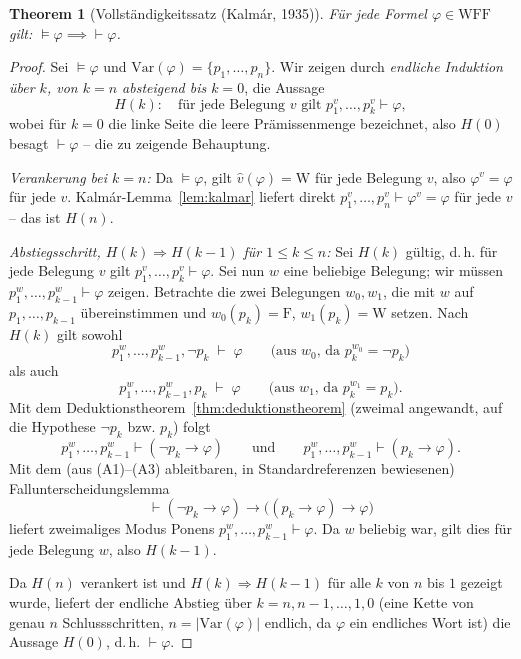\documentclass[12pt, a4paper]{article}
\newtheorem{theorem}{Theorem}[section]
\theoremstyle{definition}
\theoremstyle{remark}
\newcommand{\W}{\mathrm{W}}
\newcommand{\F}{\mathrm{F}}
\newcommand{\WFF}{\mathrm{WFF}}
\newcommand{\Var}{\mathrm{Var}}
\begin{document}
\begin{theorem}[Vollständigkeitssatz (Kalmár, 1935)]
\label{thm:vollstaendigkeit}
Für jede Formel $\varphi \in \WFF$ gilt: $\models \varphi \implies \vdash \varphi$.
\end{theorem}
\begin{proof}
Sei $\models\varphi$ und $\Var(\varphi) = \{p_1,\dots,p_n\}$. Wir zeigen durch \emph{endliche Induktion über $k$, von $k=n$ absteigend bis $k=0$}, die Aussage
\[
  H(k): \quad \text{für jede Belegung } v \text{ gilt } p_1^v,\dots,p_k^v \vdash \varphi,
\]
wobei für $k=0$ die linke Seite die leere Prämissenmenge bezeichnet, also $H(0)$ besagt $\vdash\varphi$ -- die zu zeigende Behauptung.

\emph{Verankerung bei $k=n$:} Da $\models\varphi$, gilt $\hat v(\varphi)=\W$ für jede Belegung $v$, also $\varphi^v = \varphi$ für jede $v$. Kalmár-Lemma~\ref{lem:kalmar} liefert direkt $p_1^v,\dots,p_n^v \vdash \varphi^v = \varphi$ für jede $v$ -- das ist $H(n)$.

\emph{Abstiegsschritt, $H(k) \Rightarrow H(k-1)$ für $1\le k\le n$:} Sei $H(k)$ gültig, d.\,h. für jede Belegung $v$ gilt $p_1^v,\dots,p_k^v \vdash \varphi$. Sei nun $w$ eine beliebige Belegung; wir müssen $p_1^w,\dots,p_{k-1}^w \vdash \varphi$ zeigen. Betrachte die zwei Belegungen $w_0,w_1$, die mit $w$ auf $p_1,\dots,p_{k-1}$ übereinstimmen und $w_0(p_k)=\F$, $w_1(p_k)=\W$ setzen. Nach $H(k)$ gilt sowohl
\[
  p_1^w,\dots,p_{k-1}^w, \neg p_k \;\vdash\; \varphi \qquad\text{(aus $w_0$, da $p_k^{w_0}=\neg p_k$)}
\]
als auch
\[
  p_1^w,\dots,p_{k-1}^w, p_k \;\vdash\; \varphi \qquad\text{(aus $w_1$, da $p_k^{w_1}=p_k$).}
\]
Mit dem Deduktionstheorem~\ref{thm:deduktionstheorem} (zweimal angewandt, auf die Hypothese $\neg p_k$ bzw. $p_k$) folgt
\[
  p_1^w,\dots,p_{k-1}^w \vdash (\neg p_k \to \varphi) \qquad\text{und}\qquad p_1^w,\dots,p_{k-1}^w \vdash (p_k \to \varphi).
\]
Mit dem (aus (A1)--(A3) ableitbaren, in Standardreferenzen bewiesenen) Fallunterscheidungslemma
\[
  \vdash (\neg p_k \to \varphi) \to \big((p_k\to\varphi)\to\varphi\big)
\]
liefert zweimaliges Modus Ponens $p_1^w,\dots,p_{k-1}^w \vdash \varphi$. Da $w$ beliebig war, gilt dies für jede Belegung $w$, also $H(k-1)$.

Da $H(n)$ verankert ist und $H(k)\Rightarrow H(k-1)$ für alle $k$ von $n$ bis $1$ gezeigt wurde, liefert der endliche Abstieg über $k=n,n-1,\dots,1,0$ (eine Kette von genau $n$ Schlussschritten, $n=|\Var(\varphi)|$ endlich, da $\varphi$ ein endliches Wort ist) die Aussage $H(0)$, d.\,h. $\vdash \varphi$.
\end{proof}
\end{document}
